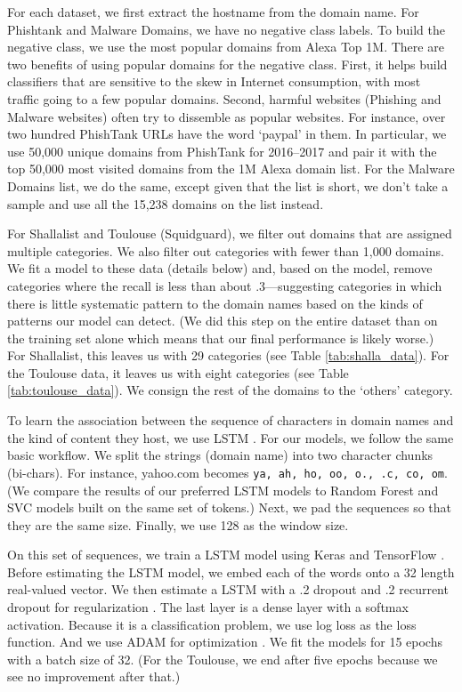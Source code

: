 \documentclass[12pt, letterpaper]{article}
\begin{document}
For each dataset, we first extract the hostname from the domain name. For Phishtank and Malware Domains, we have no negative class labels. To build the negative class, we use the most popular domains from Alexa Top 1M. There are two benefits of using popular domains for the negative class. First, it helps build classifiers that are sensitive to the skew in Internet consumption, with most traffic going to a few popular domains. Second, harmful websites (Phishing and Malware websites) often try to dissemble as popular websites. For instance, over two hundred PhishTank URLs have the word `paypal' in them. In particular, we use 50,000 unique domains from PhishTank for 2016--2017 and pair it with the top 50,000 most visited domains from the 1M Alexa domain list. For the Malware Domains list, we do the same, except given that the list is short, we don't take a sample and use all the 15,238 domains on the list instead.

For Shallalist and Toulouse (Squidguard), we filter out domains that are assigned multiple categories. We also filter out categories with fewer than 1,000 domains. We fit a model to these data (details below) and, based on the model, remove categories where the recall is less than about .3---suggesting categories in which there is little systematic pattern to the domain names based on the kinds of patterns our model can detect. (We did this step on the entire dataset than on the training set alone which means that our final performance is likely worse.) For Shallalist, this leaves us with 29 categories (see Table \ref{tab:shalla_data}). For the Toulouse data, it leaves us with eight categories (see Table \ref{tab:toulouse_data}). We consign the rest of the domains to the `others' category.

To learn the association between the sequence of characters in domain names and the kind of content they host, we use LSTM  \citep{graves2005framewise, gers1999learning}. For our models, we follow the same basic workflow. We split the strings (domain name) into two character chunks (bi-chars). For instance, yahoo.com becomes {\tt ya, ah, ho, oo, o., .c, co, om}. (We compare the results of our preferred LSTM models to Random Forest and SVC models built on the same set of tokens.) Next, we pad the sequences so that they are the same size. Finally, we use 128 as the window size.

On this set of sequences, we train a LSTM model using Keras \citep{chollet2015keras} and TensorFlow \citep{abadi2016tensorflow}. Before estimating the LSTM model, we embed each of the words onto a 32 length real-valued vector. We then estimate a LSTM with a .2 dropout and .2 recurrent dropout for regularization \citep{srivastava2014dropout}. The last layer is a dense layer with a softmax activation. Because it is a classification problem, we use log loss as the loss function. And we use ADAM for optimization \citep{kingma2014adam}. We fit the models for 15 epochs with a batch size of 32. (For the Toulouse, we end after five epochs because we see no improvement after that.)
\end{document}
